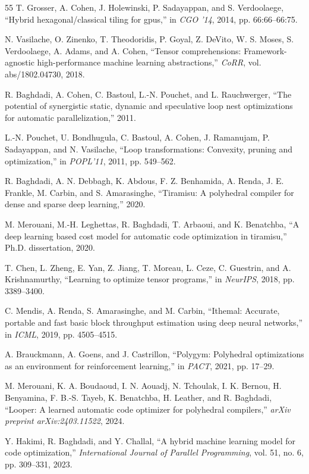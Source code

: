 \documentclass[10pt,twocolumn]{article}
\begin{document}
\begin{thebibliography}{55}
 T. Grosser, A. Cohen, J. Holewinski, P. Sadayappan, and S. Verdoolaege, ``Hybrid hexagonal/classical tiling for gpus,'' in \emph{CGO '14}, 2014, pp. 66:66--66:75.

 N. Vasilache, O. Zinenko, T. Theodoridis, P. Goyal, Z. DeVito, W. S. Moses, S. Verdoolaege, A. Adams, and A. Cohen, ``Tensor comprehensions: Framework-agnostic high-performance machine learning abstractions,'' \emph{CoRR}, vol. abs/1802.04730, 2018.

 R. Baghdadi, A. Cohen, C. Bastoul, L.-N. Pouchet, and L. Rauchwerger, ``The potential of synergistic static, dynamic and speculative loop nest optimizations for automatic parallelization,'' 2011.

 L.-N. Pouchet, U. Bondhugula, C. Bastoul, A. Cohen, J. Ramanujam, P. Sadayappan, and N. Vasilache, ``Loop transformations: Convexity, pruning and optimization,'' in \emph{POPL'11}, 2011, pp. 549--562.

 R. Baghdadi, A. N. Debbagh, K. Abdous, F. Z. Benhamida, A. Renda, J. E. Frankle, M. Carbin, and S. Amarasinghe, ``Tiramisu: A polyhedral compiler for dense and sparse deep learning,'' 2020.

 M. Merouani, M.-H. Leghettas, R. Baghdadi, T. Arbaoui, and K. Benatchba, ``A deep learning based cost model for automatic code optimization in tiramisu,'' Ph.D. dissertation, 2020.

 T. Chen, L. Zheng, E. Yan, Z. Jiang, T. Moreau, L. Ceze, C. Guestrin, and A. Krishnamurthy, ``Learning to optimize tensor programs,'' in \emph{NeurIPS}, 2018, pp. 3389--3400.

 C. Mendis, A. Renda, S. Amarasinghe, and M. Carbin, ``Ithemal: Accurate, portable and fast basic block throughput estimation using deep neural networks,'' in \emph{ICML}, 2019, pp. 4505--4515.

 A. Brauckmann, A. Goens, and J. Castrillon, ``Polygym: Polyhedral optimizations as an environment for reinforcement learning,'' in \emph{PACT}, 2021, pp. 17--29.

 M. Merouani, K. A. Boudaoud, I. N. Aouadj, N. Tchoulak, I. K. Bernou, H. Benyamina, F. B.-S. Tayeb, K. Benatchba, H. Leather, and R. Baghdadi, ``Looper: A learned automatic code optimizer for polyhedral compilers,'' \emph{arXiv preprint arXiv:2403.11522}, 2024.

 Y. Hakimi, R. Baghdadi, and Y. Challal, ``A hybrid machine learning model for code optimization,'' \emph{International Journal of Parallel Programming}, vol. 51, no. 6, pp. 309--331, 2023.


\end{thebibliography}
\end{document}
